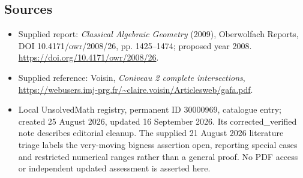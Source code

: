 \documentclass[11pt]{article}
\begin{document}
\subsection{Sources}
\begin{itemize}
\item Supplied report: \emph{Classical Algebraic Geometry} (2009), Oberwolfach Reports, DOI 10.4171/owr/2008/26, pp. 1425--1474; proposed year 2008. \url{https://doi.org/10.4171/owr/2008/26}.
\item Supplied reference: Voisin, \emph{Coniveau 2 complete intersections}, \url{https://webusers.imj-prg.fr/~claire.voisin/Articlesweb/gafa.pdf}.
\item Local UnsolvedMath registry, permanent ID 30000969, catalogue entry; created 25 August 2026, updated 16 September 2026. Its corrected\_verified note describes editorial cleanup. The supplied 21 August 2026 literature triage labels the very-moving bigness assertion open, reporting special cases and restricted numerical ranges rather than a general proof. No PDF access or independent updated assessment is asserted here.
\end{itemize}
\end{document}

